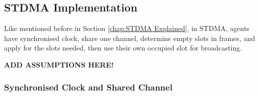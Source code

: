 \subsection{STDMA Implementation}
\label{chap:STDMA Implementation}

Like mentioned before in Section \ref{chap:STDMA Explained}, in STDMA, agents have synchronised clock, share one channel, determine empty slots in frames, and apply for the slots needed, then use their own occupied slot for broadcasting.


\begin{centering}
\textbf{ADD ASSUMPTIONS HERE!}
\end{centering}


\subsubsection{Synchronised Clock and Shared Channel}


